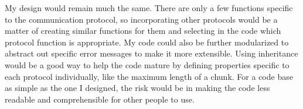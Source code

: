 \documentclass{article}
\begin{document}
\begin{itemize}
		My design would remain much the same. There are only a few functions specific to the communication protocol, so incorporating other protocols would be a matter of creating similar functions for them and selecting in the code which protocol function is appropriate. My code could also be further modularized to abstract out specific error messages to make it more extensible. Using inheritance would be a good way to help the code mature by defining properties specific to each protocol individually, like the maximum length of a chunk. For a code base as simple as the one I designed, the risk would be in making the code less readable and comprehensible for other people to use. 
		
	\end{itemize}
\end{document}
